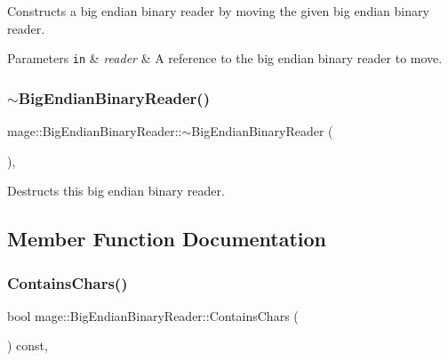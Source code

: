 Constructs a big endian binary reader by moving the given big endian binary reader.


\begin{DoxyParams}[1]{Parameters}
\mbox{\tt in}  & {\em reader} & A reference to the big endian binary reader to move. \\
\hline
\end{DoxyParams}
\mbox{\label{classmage_1_1_big_endian_binary_reader_ae85a40e8ed06e8c887e38d914843b8d3}} 
\subsubsection{\texorpdfstring{$\sim$\+Big\+Endian\+Binary\+Reader()}{~BigEndianBinaryReader()}}
{\footnotesize\ttfamily mage\+::\+Big\+Endian\+Binary\+Reader\+::$\sim$\+Big\+Endian\+Binary\+Reader (\begin{DoxyParamCaption}{ }\end{DoxyParamCaption})\hspace{0.3cm}{\ttfamily [protected]}, {\ttfamily [default]}}

Destructs this big endian binary reader. 

\subsection{Member Function Documentation}
\mbox{\label{classmage_1_1_big_endian_binary_reader_ac6de015b6bbcecdcef58ab074d99fb49}} 
\subsubsection{\texorpdfstring{Contains\+Chars()}{ContainsChars()}}
{\footnotesize\ttfamily bool mage\+::\+Big\+Endian\+Binary\+Reader\+::\+Contains\+Chars (\begin{DoxyParamCaption}{ }\end{DoxyParamCaption}) const\hspace{0.3cm}{\ttfamily [protected]}, {\ttfamily [noexcept]}}

